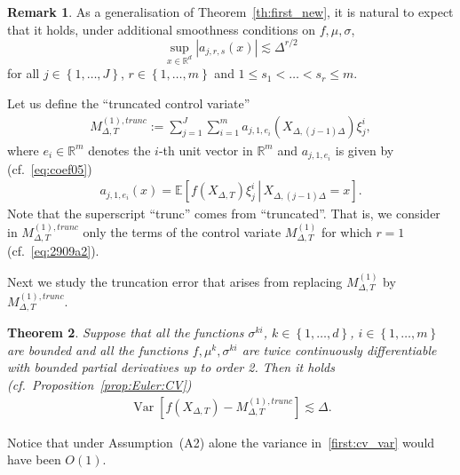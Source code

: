 \documentclass[11pt,a4paper]{amsart}
\theoremstyle{plain}
\newtheorem{theorem}{Theorem}[section]
\theoremstyle{definition}
\newtheorem{remark}[theorem]{Remark}
\theoremstyle{remark}
\numberwithin{equation}{section}
\newcommand*{\Var}{\operatorname{Var}}
\newcommand*{\EE}{\mathbb E}
\newcommand*{\RR}{\mathbb R}
\renewcommand*{\doteq}{:=}
\begin{document}
\begin{remark}
As a generalisation of Theorem~\ref{th:first_new}, it is natural to expect that it holds, under additional smoothness conditions on $f,\mu,\sigma$,
$$
\sup_{x\in\RR^d}\left|a_{j,r,s}(x)\right|\lesssim \Delta^{r/2}
$$
for all $j\in\left\{1,\ldots,J\right\}$, $r\in\left\{1,\ldots,m\right\}$ and $1\le s_1< \ldots < s_r\le m$.
\end{remark}

Let us define the ``truncated control variate'' 
\begin{align}
\label{cv:first_trunc}
M_{\Delta,T}^{(1),trunc}\doteq \sum_{j=1}^J\sum_{i=1}^ma_{j,1,e_i}(X_{\Delta,(j-1)\Delta})\xi_j^i,
\end{align}
where $e_i\in\RR^m$ denotes the $i$-th unit vector in $\RR^m$ and $a_{j,1,e_i}$ is given by (cf.~\eqref{eq:coef05})
\begin{align*}
a_{j,1,e_i}(x)
=\EE\left[\left.
f(X_{\Delta,T})\xi_j^i 
\,\right|\,
X_{\Delta,(j-1)\Delta}=x
\right].
\end{align*}
Note that the superscript ``trunc'' comes from ``truncated''. That is, we consider in $M_{\Delta,T}^{(1),trunc}$ only the terms of the control variate $M_{\Delta,T}^{(1)}$ for which $r=1$ (cf.~\eqref{eq:2909a2}). 

Next we study the truncation error that arises from replacing $M_{\Delta,T}^{(1)}$ by $M_{\Delta,T}^{(1),trunc}$.
\begin{theorem}
\label{th:first_var}
Suppose that all the functions $\sigma^{ki}$, $k\in\left\{1,\ldots,d\right\}$, $i\in\left\{1,\ldots,m\right\}$ are bounded and all the functions $f,\mu^k,\sigma^{ki}$ are twice continuously differentiable with bounded partial derivatives up to order 2. Then it holds (cf.\ Proposition~\ref{prop:Euler:CV})
\begin{align}
\label{first:cv_var}
\Var\left[f(X_{\Delta,T})-M_{\Delta,T}^{(1),trunc}\right]\lesssim\Delta.
\end{align}
\end{theorem}
Notice that under Assumption~(A2) alone
the variance in~\eqref{first:cv_var} would have been $O(1)$.
\end{document}
